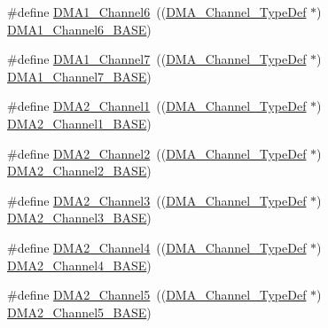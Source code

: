 \begin{DoxyCompactItemize}
\item 
\#define \hyperlink{group___peripheral__declaration_gac013c4376e4797831b5ddd2a09519df8}{D\+M\+A1\+\_\+\+Channel6}~((\hyperlink{struct_d_m_a___channel___type_def}{D\+M\+A\+\_\+\+Channel\+\_\+\+Type\+Def} $\ast$) \hyperlink{group___peripheral__memory__map_ga896c2c7585dd8bc3969cf8561f689d2d}{D\+M\+A1\+\_\+\+Channel6\+\_\+\+B\+A\+SE})
\item 
\#define \hyperlink{group___peripheral__declaration_ga4f9c23b3d1add93ed206b5c9afa5cda3}{D\+M\+A1\+\_\+\+Channel7}~((\hyperlink{struct_d_m_a___channel___type_def}{D\+M\+A\+\_\+\+Channel\+\_\+\+Type\+Def} $\ast$) \hyperlink{group___peripheral__memory__map_gaeee0d1f77d0db1db533016a09351166c}{D\+M\+A1\+\_\+\+Channel7\+\_\+\+B\+A\+SE})
\item 
\#define \hyperlink{group___peripheral__declaration_gad86c75e1ff89e03e15570f47962865c8}{D\+M\+A2\+\_\+\+Channel1}~((\hyperlink{struct_d_m_a___channel___type_def}{D\+M\+A\+\_\+\+Channel\+\_\+\+Type\+Def} $\ast$) \hyperlink{group___peripheral__memory__map_gad3bd6c4201d12f5d474518c1b02f8e3b}{D\+M\+A2\+\_\+\+Channel1\+\_\+\+B\+A\+SE})
\item 
\#define \hyperlink{group___peripheral__declaration_ga316024020799373b9d8e35c316c74f24}{D\+M\+A2\+\_\+\+Channel2}~((\hyperlink{struct_d_m_a___channel___type_def}{D\+M\+A\+\_\+\+Channel\+\_\+\+Type\+Def} $\ast$) \hyperlink{group___peripheral__memory__map_ga22f39f23c879c699b88e04a629f69d1c}{D\+M\+A2\+\_\+\+Channel2\+\_\+\+B\+A\+SE})
\item 
\#define \hyperlink{group___peripheral__declaration_ga6dca52a79587e0ca9a5d669048b4c7eb}{D\+M\+A2\+\_\+\+Channel3}~((\hyperlink{struct_d_m_a___channel___type_def}{D\+M\+A\+\_\+\+Channel\+\_\+\+Type\+Def} $\ast$) \hyperlink{group___peripheral__memory__map_ga6f2369b8bc155fb55a28891987605c2c}{D\+M\+A2\+\_\+\+Channel3\+\_\+\+B\+A\+SE})
\item 
\#define \hyperlink{group___peripheral__declaration_ga612b396657695191ad740b0b59bc9f12}{D\+M\+A2\+\_\+\+Channel4}~((\hyperlink{struct_d_m_a___channel___type_def}{D\+M\+A\+\_\+\+Channel\+\_\+\+Type\+Def} $\ast$) \hyperlink{group___peripheral__memory__map_ga01b063266473f290a55047654fbbfbee}{D\+M\+A2\+\_\+\+Channel4\+\_\+\+B\+A\+SE})
\item 
\#define \hyperlink{group___peripheral__declaration_ga521c13b7d0f82a6897d47995da392750}{D\+M\+A2\+\_\+\+Channel5}~((\hyperlink{struct_d_m_a___channel___type_def}{D\+M\+A\+\_\+\+Channel\+\_\+\+Type\+Def} $\ast$) \hyperlink{group___peripheral__memory__map_ga1eea983a5d68bf36f4d19fbb07955ca1}{D\+M\+A2\+\_\+\+Channel5\+\_\+\+B\+A\+SE})

\end{DoxyCompactItemize}
